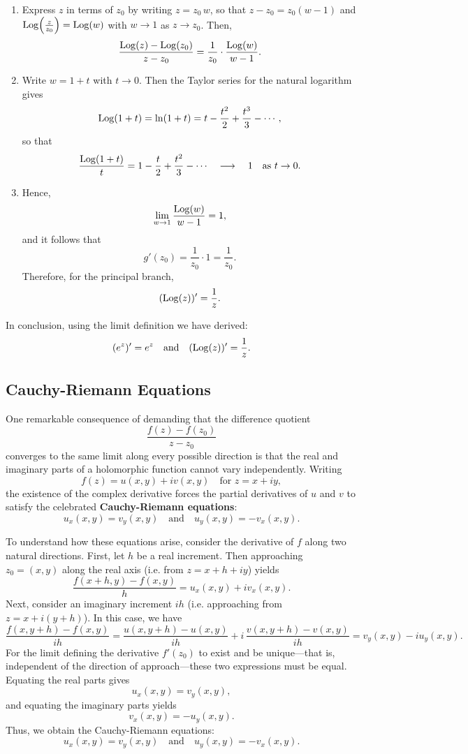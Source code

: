 \begin{example}
\begin{solution}
\begin{enumerate}
\begin{enumerate}
  \item Express \(z\) in terms of \(z_0\) by writing \(z = z_0\,w\), so that \(z - z_0 = z_0 (w-1)\) and \(\operatorname{Log}\!\left(\frac{z}{z_0}\right)=\operatorname{Log}(w)\) with \(w\to 1\) as \(z\to z_0\). Then,
  \[
  \frac{\operatorname{Log}(z)-\operatorname{Log}(z_0)}{z-z_0} = \frac{1}{z_0}\cdot\frac{\operatorname{Log}(w)}{w-1}.
  \]
  
  \item Write \(w=1+t\) with \(t\to0\). Then the Taylor series for the natural logarithm gives
  \[
  \operatorname{Log}(1+t)=\ln(1+t)=t-\frac{t^2}{2}+\frac{t^3}{3}-\cdots,
  \]
  so that
  \[
  \frac{\operatorname{Log}(1+t)}{t} = 1-\frac{t}{2}+\frac{t^2}{3}-\cdots \quad \longrightarrow \quad 1\quad \text{as } t\to0.
  \]
  
  \item Hence,
  \[
  \lim_{w\to1}\frac{\operatorname{Log}(w)}{w-1} = 1,
  \]
  and it follows that
  \[
  g'(z_0)=\frac{1}{z_0}\cdot 1 = \frac{1}{z_0}.
  \]
  Therefore, for the principal branch,
  \[
  (\operatorname{Log}(z))' = \frac{1}{z}.
  \]
\end{enumerate}

\end{enumerate}

\noindent In conclusion, using the limit definition we have derived:
\[
(e^z)'=e^z \quad \text{and} \quad (\operatorname{Log}(z))'=\frac{1}{z}.
\]
\end{solution}
\end{example}
\exampleline

\subsection*{Cauchy-Riemann Equations} 

\noindent One remarkable consequence of demanding that the difference quotient
\[
\frac{f(z)-f(z_0)}{z-z_0}
\]
converges to the same limit along every possible direction is that the real and imaginary parts of a holomorphic function cannot vary independently. Writing
\[
f(z)=u(x,y)+iv(x,y) \quad \text{for } z=x+iy,
\]
the existence of the complex derivative forces the partial derivatives of \(u\) and \(v\) to satisfy the celebrated \textbf{Cauchy-Riemann equations}:
\[
u_x(x,y)=v_y(x,y) \quad \text{and} \quad u_y(x,y)=-v_x(x,y).
\]


\noindent To understand how these equations arise, consider the derivative of \(f\) along two natural directions. First, let \(h\) be a real increment. Then approaching \(z_0=(x,y)\) along the real axis (i.e. from \(z=x+h+iy\)) yields
\[
\frac{f(x+h,y)-f(x,y)}{h} = u_x(x,y) + iv_x(x,y).
\]
Next, consider an imaginary increment \(ih\) (i.e. approaching from \(z=x+i(y+h)\)). In this case, we have
\[
\frac{f(x,y+h)-f(x,y)}{ih} = \frac{u(x,y+h)-u(x,y)}{ih} + i\,\frac{v(x,y+h)-v(x,y)}{ih} = v_y(x,y) - iu_y(x,y).
\]
For the limit defining the derivative \(f'(z_0)\) to exist and be unique—that is, independent of the direction of approach—these two expressions must be equal. Equating the real parts gives
\[
u_x(x,y) = v_y(x,y),
\]
and equating the imaginary parts yields
\[
v_x(x,y) = -u_y(x,y).
\]
Thus, we obtain the Cauchy-Riemann equations:
\[
u_x(x,y)=v_y(x,y) \quad \text{and} \quad u_y(x,y)=-v_x(x,y).
\]


